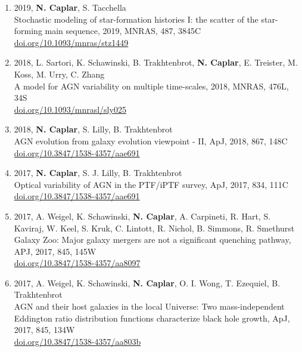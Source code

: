 \documentclass[11pt,letterpaper]{article}
\begin{document}
\begin{enumerate}
\item 2019, \textbf{N. Caplar}, S. Tacchella \\
Stochastic modeling of star-formation histories I: the scatter of the star-forming main sequence, 2019, MNRAS, 487, 3845C\\
\href{https://doi.org/10.1093/mnras/stz1449}{doi.org/10.1093/mnras/stz1449} \\

\item 2018, L. Sartori, K. Schawinski, B. Trakhtenbrot, \textbf{N. Caplar}, E. Treister, M. Koss, M. Urry, C. Zhang \\
A model for AGN variability on multiple time-scales, 2018, MNRAS, 476L, 34S\\
\href{https://doi.org/10.1093/mnrasl/sly025}{doi.org/10.1093/mnrasl/sly025} \\ 

\item 2018, \textbf{N. Caplar}, S. Lilly, B. Trakhtenbrot\\
AGN evolution from galaxy evolution viewpoint - II, ApJ, 2018, 867, 148C\\
\href{https://doi.org/10.3847/1538-4357/aae691}{doi.org/10.3847/1538-4357/aae691} \\ 

\item 2017,  \textbf{N. Caplar}, S. J. Lilly, B. Trakhtenbrot   \\Optical variability of AGN in the PTF/iPTF survey, ApJ, 2017, 834, 111C   \\
 \href{https://doi.org/10.3847/1538-4357/aae691}{doi.org/10.3847/1538-4357/aae691} \\ 
 
\item 2017, A. Weigel, K. Schawinski,  \textbf{N. Caplar}, A. Carpineti, R. Hart, S. Kaviraj, W. Keel, S. Kruk, C. Lintott, R. Nichol, B. Simmons, R. Smethurst
\\    Galaxy Zoo:  Major galaxy mergers are not a significant quenching pathway, APJ, 2017, 845, 145W \\
\href{https://doi.org/10.3847/1538-4357/aa8097}{doi.org/10.3847/1538-4357/aa8097} \\ 

\item 2017, A. Weigel, K. Schawinski,  \textbf{N. Caplar}, O. I. Wong, T. Ezequiel, B. Trakhtenbrot
\\    AGN and their host galaxies in the local Universe: Two mass-independent Eddington ratio distribution functions characterize black hole growth, ApJ, 2017, 845, 134W \\
 \href{https://doi.org/10.3847/1538-4357/aa803b}{doi.org/10.3847/1538-4357/aa803b} \\ 


\end{enumerate}
\end{document}
